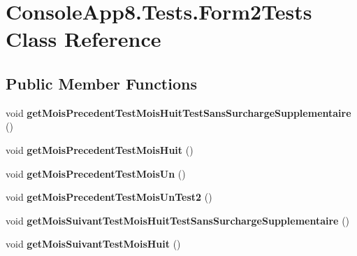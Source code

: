 \hypertarget{class_console_app8_1_1_tests_1_1_form2_tests}{}\section{Console\+App8.\+Tests.\+Form2\+Tests Class Reference}
\label{class_console_app8_1_1_tests_1_1_form2_tests}
\subsection*{Public Member Functions}
\begin{DoxyCompactItemize}
\item 
\mbox{\label{class_console_app8_1_1_tests_1_1_form2_tests_a5a82a8f650575d64b1444f9c35fbf710}} 
void {\bfseries get\+Mois\+Precedent\+Test\+Mois\+Huit\+Test\+Sans\+Surcharge\+Supplementaire} ()
\item 
\mbox{\label{class_console_app8_1_1_tests_1_1_form2_tests_ab73d1cfc7e61a565b28181fa0a66c677}} 
void {\bfseries get\+Mois\+Precedent\+Test\+Mois\+Huit} ()
\item 
\mbox{\label{class_console_app8_1_1_tests_1_1_form2_tests_a9fdcff75d6747ee85356acc669425ca6}} 
void {\bfseries get\+Mois\+Precedent\+Test\+Mois\+Un} ()
\item 
\mbox{\label{class_console_app8_1_1_tests_1_1_form2_tests_a540fe785b546cdc7415b4f8e2d928114}} 
void {\bfseries get\+Mois\+Precedent\+Test\+Mois\+Un\+Test2} ()
\item 
\mbox{\label{class_console_app8_1_1_tests_1_1_form2_tests_a7da65ea46fbe9a396c38a0258d08467b}} 
void {\bfseries get\+Mois\+Suivant\+Test\+Mois\+Huit\+Test\+Sans\+Surcharge\+Supplementaire} ()
\item 
\mbox{\label{class_console_app8_1_1_tests_1_1_form2_tests_ace353addc98acd10843017c2b47cf7bd}} 
void {\bfseries get\+Mois\+Suivant\+Test\+Mois\+Huit} ()
\item 
\mbox{\label{class_console_app8_1_1_tests_1_1_form2_tests_a12abecf679d6d4c05e7b7417945756cc}} 

\end{DoxyCompactItemize}
